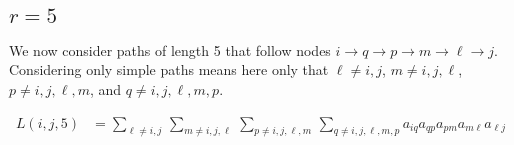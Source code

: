 \documentclass[11pt]{article} %
\begin{document}
\subsection{$r=5$}
We now consider paths of length 5 that follow nodes $i \to q \to p \to m \to \ell \to j$.  Considering only simple paths means here only that $\ell\neq i,j$, $m\neq i,j,\ell$, $p\neq i,j,\ell,m$, and $q\neq i,j,\ell,m,p$.

\begin{align}
  L(i,j,5) &= \sum_{\ell \neq i,j} \, \sum_{m\neq i,j,\ell} \, \sum_{p\neq i,j,\ell,m} \, \sum_{q\neq i,j,\ell,m,p} a_{iq} a_{qp} a_{pm} a_{m\ell} a_{\ell j} \\
\end{align}
\end{document}
